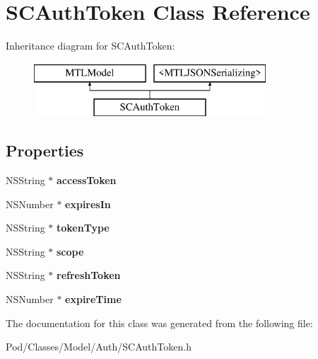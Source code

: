 \hypertarget{interface_s_c_auth_token}{}\section{S\+C\+Auth\+Token Class Reference}
\label{interface_s_c_auth_token}
Inheritance diagram for S\+C\+Auth\+Token\+:\begin{figure}[H]
\begin{center}
\leavevmode
\includegraphics[height=2.000000cm]{interface_s_c_auth_token}
\end{center}
\end{figure}
\subsection*{Properties}
\begin{DoxyCompactItemize}
\item 
N\+S\+String $\ast$ {\bfseries access\+Token}\hypertarget{interface_s_c_auth_token_a6e59253b65784dae658cec754b78bcbc}{}\label{interface_s_c_auth_token_a6e59253b65784dae658cec754b78bcbc}

\item 
N\+S\+Number $\ast$ {\bfseries expires\+In}\hypertarget{interface_s_c_auth_token_aacbef60d9723c39d36096d1c61d38180}{}\label{interface_s_c_auth_token_aacbef60d9723c39d36096d1c61d38180}

\item 
N\+S\+String $\ast$ {\bfseries token\+Type}\hypertarget{interface_s_c_auth_token_ae144bedf9e12bf3b79966629b9843e90}{}\label{interface_s_c_auth_token_ae144bedf9e12bf3b79966629b9843e90}

\item 
N\+S\+String $\ast$ {\bfseries scope}\hypertarget{interface_s_c_auth_token_a6d0163f229a0553fd716a10c77711568}{}\label{interface_s_c_auth_token_a6d0163f229a0553fd716a10c77711568}

\item 
N\+S\+String $\ast$ {\bfseries refresh\+Token}\hypertarget{interface_s_c_auth_token_a7d29cf712ab87b2d0bed2f1bbb0148b7}{}\label{interface_s_c_auth_token_a7d29cf712ab87b2d0bed2f1bbb0148b7}

\item 
N\+S\+Number $\ast$ {\bfseries expire\+Time}\hypertarget{interface_s_c_auth_token_a3edf16d30da72b7009e84b00027fc7d0}{}\label{interface_s_c_auth_token_a3edf16d30da72b7009e84b00027fc7d0}

\end{DoxyCompactItemize}


The documentation for this class was generated from the following file\+:\begin{DoxyCompactItemize}
\item 
Pod/\+Classes/\+Model/\+Auth/S\+C\+Auth\+Token.\+h\end{DoxyCompactItemize}
